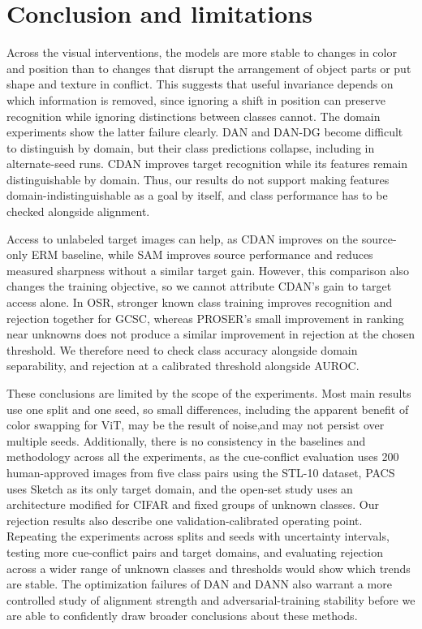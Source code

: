 \documentclass{article}
\begin{document}
\FloatBarrier
\section{Conclusion and limitations}
Across the visual interventions, the models are more stable to changes in color and position than to changes that disrupt the arrangement of object parts or put shape and texture in conflict. This suggests that useful invariance depends on which information is removed, since ignoring a shift in position can preserve recognition while ignoring distinctions between classes cannot. The domain experiments show the latter failure clearly. DAN and DAN-DG become difficult to distinguish by domain, but their class predictions collapse, including in alternate-seed runs. CDAN improves target recognition while its features remain distinguishable by domain. Thus, our results do not support making features domain-indistinguishable as a goal by itself, and class performance has to be checked alongside alignment.

Access to unlabeled target images can help, as CDAN improves on the source-only ERM baseline, while SAM improves source performance and reduces measured sharpness without a similar target gain. However, this comparison also changes the training objective, so we cannot attribute CDAN's gain to target access alone. In OSR, stronger known class training improves recognition and rejection together for GCSC, whereas PROSER's small improvement in ranking near unknowns does not produce a similar improvement in rejection at the chosen threshold. We therefore need to check class accuracy alongside domain separability, and rejection at a calibrated threshold alongside AUROC.

These conclusions are limited by the scope of the experiments. Most main results use one split and one seed, so small differences, including the apparent benefit of color swapping for ViT, may be the result of noise,and may not persist over multiple seeds. Additionally, there is no consistency in the baselines and methodology across all the experiments, as the cue-conflict evaluation uses 200 human-approved images from five class pairs using the STL-10 dataset, PACS uses Sketch as its only target domain, and the open-set study uses an architecture modified for CIFAR and fixed groups of unknown classes. Our rejection results also describe one validation-calibrated operating point. Repeating the experiments across splits and seeds with uncertainty intervals, testing more cue-conflict pairs and target domains, and evaluating rejection across a wider range of unknown classes and thresholds would show which trends are stable. The optimization failures of DAN and DANN also warrant a more controlled study of alignment strength and adversarial-training stability before we are able to confidently draw broader conclusions about these methods.
\end{document}

